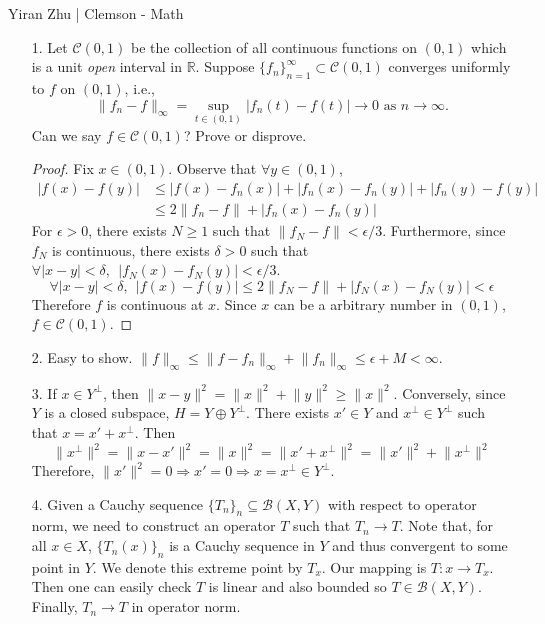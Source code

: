 		\begin{center}
			\normalsize{Yiran Zhu | Clemson - Math}
		\end{center}
\begin{itemize}
		\item[1.] Let $\mathcal{C}(0, 1)$ be the collection of all continuous functions on $(0, 1)$ which is a unit \textit{open} interval in $\mathbb{R}$. Suppose $\{f_n\}_{n=1}^\infty \subset \mathcal{C}(0, 1)$ converges uniformly to $f$ on $(0, 1)$, i.e.,
		$$\lVert f_n -f\rVert_\infty = \sup_{t\in (0,1)} |f_n(t)-f(t)| \rightarrow 0 \text{ as } n \rightarrow \infty.
		$$
		Can we say $f \in \mathcal{C}(0, 1)$? Prove or disprove.

		\begin{proof}
			Fix $x\in (0,1)$. Observe that $\forall y\in (0,1)$, 
			$$
			\begin{aligned}
			\lvert f(x) - f(y) \rvert &\le  \lvert f(x) - f_n(x) \rvert + \lvert f_n(x) - f_n(y) \rvert + \lvert f_n(y) - f(y)\rvert\\
			&\le 2\lVert f_n- f\rVert +  \lvert f_n(x) - f_n(y) \rvert 
			\end{aligned}
			$$
			For $\epsilon >0$, there exists $N\ge 1$ such that $\lVert f_N-f\rVert < \epsilon/3$. Furthermore, since $f_N$ is continuous, there exists $\delta >0$ such that $\forall \lvert x-y\rvert < \delta, ~~|f_N(x) - f_N(y)|<\epsilon/3$.
			$$
			\forall |x-y|< \delta, ~~\lvert f(x) - f(y) \rvert \le 2\lVert f_N- f\rVert +  \lvert f_N(x) - f_N(y) \rvert  < \epsilon
			$$
			Therefore $f$ is continuous at $x$. Since $x$ can be a arbitrary number in $(0,1)$, $f \in \mathcal{C}(0,1)$.
		\end{proof}
		
		\item[2.] Easy to show. $\lVert f\rVert_\infty \le \lVert f-f_n\rVert_\infty + \lVert f_n\rVert_\infty \le \epsilon + M < \infty$.
		
		\item[3.] If $x\in Y^\perp$, then $\lVert x-y\rVert^2 = \lVert x\rVert^2 +  \lVert y\rVert^2 \ge \lVert x\rVert^2$. Conversely, since $Y$ is a closed subspace, $H= Y\oplus Y^\perp$. There exists $x' \in Y$ and $x^\perp \in Y^\perp$ such that $x = x'+x^\perp$. Then 
		$$
		\lVert x^\perp \rVert^2=\lVert x - x'\rVert^2 = \lVert x\rVert^2 = \lVert  x'+x^\perp\rVert^2 =  \lVert x'\rVert^2+\lVert x^\perp\rVert^2
		$$
		Therefore, $\lVert x'\rVert^2 = 0 \Rightarrow x' = 0 \Rightarrow x= x^\perp \in Y^\perp$.
		
		\item[4.]  Given a Cauchy sequence $\{T_n\}_n\subseteq \mathcal{B}(X,Y)$ with respect to operator norm, we need to construct an operator $T$ such that $T_n\rightarrow T$. Note that, for all $x\in X$, $\{T_n(x)\}_n$ is a Cauchy sequence in $Y$ and thus convergent to some point in $Y$. We denote this extreme point by $T_x$. Our mapping is $T: x\rightarrow T_x$. Then one can easily check $T$ is linear and also bounded so $T\in \mathcal{B}(X,Y)$. Finally, $T_n\rightarrow T$ in operator norm. 
		

\end{itemize}
